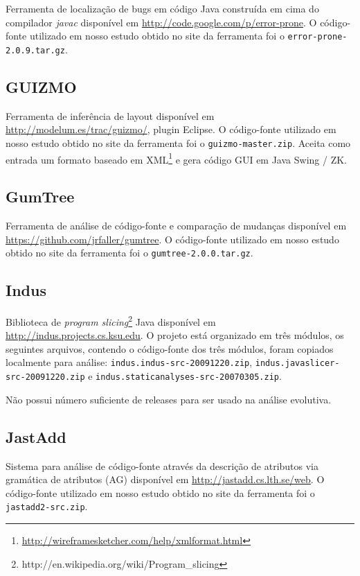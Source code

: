 Ferramenta de localização de bugs em código Java construída em cima do
compilador {\it javac} disponível em
\url{http://code.google.com/p/error-prone}. O código-fonte utilizado em nosso
estudo obtido no site da ferramenta foi o \texttt{error-prone-2.0.9.tar.gz}.

\subsection{GUIZMO}

Ferramenta de inferência de layout disponível em
\url{http://modelum.es/trac/guizmo/}, plugin Eclipse. O código-fonte
utilizado em nosso estudo obtido no site da ferramenta foi o
\texttt{guizmo-master.zip}. Aceita como entrada um formato baseado em
XML\footnote{\url{http://wireframesketcher.com/help/xmlformat.html}} e gera
código GUI em Java Swing / ZK.

\subsection{GumTree}

Ferramenta de análise de código-fonte e comparação de mudanças
disponível em \url{https://github.com/jrfaller/gumtree}. O
código-fonte utilizado em nosso estudo obtido no site da ferramenta foi o
\texttt{gumtree-2.0.0.tar.gz}.

\subsection{Indus}

Biblioteca de {\it program
slicing}\footnote{http://en.wikipedia.org/wiki/Program\_slicing} Java disponível em
\url{http://indus.projects.cs.ksu.edu}. O projeto está organizado em três
módulos, os seguintes arquivos, contendo o código-fonte dos três módulos,
foram copiados localmente para análise:
\texttt{indus.indus-src-20091220.zip},
\texttt{indus.javaslicer-src-20091220.zip} e
\texttt{indus.staticanalyses-src-20070305.zip}.

Não possui número suficiente de releases para ser usado na análise evolutiva.

\subsection{JastAdd}

Sistema para análise de código-fonte através da descrição de
atributos via gramática de atributos (AG) disponível em \url{http://jastadd.cs.lth.se/web}. O código-fonte
utilizado em nosso estudo obtido no site da ferramenta foi o
\texttt{jastadd2-src.zip}.


